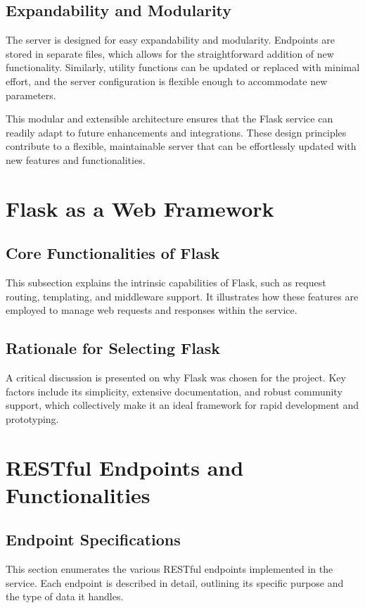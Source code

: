 \subsection{Expandability and Modularity}

The server is designed for easy expandability and modularity. Endpoints are stored in separate files, which allows for the straightforward addition of new functionality. Similarly, utility functions can be updated or replaced with minimal effort, and the server configuration is flexible enough to accommodate new parameters.

This modular and extensible architecture ensures that the Flask service can readily adapt to future enhancements and integrations. These design principles contribute to a flexible, maintainable server that can be effortlessly updated with new features and functionalities.


\section{Flask as a Web Framework}

\subsection{Core Functionalities of Flask}
This subsection explains the intrinsic capabilities of Flask, such as request routing, templating, and middleware support. It illustrates how these features are employed to manage web requests and responses within the service.

\subsection{Rationale for Selecting Flask}
A critical discussion is presented on why Flask was chosen for the project. Key factors include its simplicity, extensive documentation, and robust community support, which collectively make it an ideal framework for rapid development and prototyping.

\section{RESTful Endpoints and Functionalities}
\label{sec:endpoints}
\subsection{Endpoint Specifications}
This section enumerates the various RESTful endpoints implemented in the service. Each endpoint is described in detail, outlining its specific purpose and the type of data it handles.

